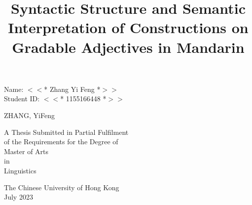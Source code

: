 \documentclass{ctexart}
\title{\LARGE{\bfseries{Syntactic Structure and Semantic Interpretation of Constructions on Gradable Adjectives in Mandarin}}}
\date{\vspace{-10ex}}
\begin{document}
\begin{center}
Name: $<<$* Zhang Yi Feng *$>>$ \\
Student ID: $<<$* 1155166448 *$>>$
\end{center}

\thispagestyle{empty} %


\newpage

{\let\newpage\relax\maketitle}

\vspace{10ex}

\begin{center}
\Large{ZHANG, YiFeng}
\end{center}

\vspace{25ex}

\begin{center}
    \Large{
        A Thesis Submitted in Partial Fulfilment \\
        of the Requirements for the Degree of \\
        Master of Arts \\
        in \\
        Linguistics
        }
\end{center}

\vspace{20ex}

\begin{center}
    \Large{
        The Chinese University of Hong Kong \\
        July 2023
        }
\end{center}

\thispagestyle{empty} %

\newpage
\end{document}
